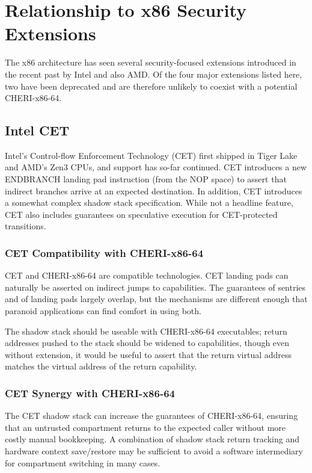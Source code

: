 \section{Relationship to x86 Security Extensions}

The x86 architecture has seen several security-focused extensions introduced
in the recent past by Intel and also AMD.
Of the four major extensions listed here, two have been deprecated
and are therefore unlikely to coexist with a potential CHERI-x86-64.

\subsection{Intel CET}
Intel's Control-flow Enforcement Technology (CET) first shipped in Tiger Lake
and AMD's Zen3 CPUs, and support has so-far continued.
CET introduces a new ENDBRANCH landing pad instruction (from the NOP space) to
assert that indirect branches arrive at an expected destination.
In addition, CET introduces a somewhat complex shadow stack specification.
While not a headline feature,
CET also includes guarantees on speculative execution for CET-protected
transitions.

\subsubsection{CET Compatibility with CHERI-x86-64}
CET and CHERI-x86-64 are compatible technologies.
CET landing pads can naturally be asserted on indirect jumps to capabilities.
The guarantees of sentries and of landing pads largely overlap, but the
mechanisms are different enough that paranoid applications can find comfort
in using both.

The shadow stack should be useable with CHERI-x86-64 executables;
return addresses pushed to the stack should be widened to capabilities,
though even without extension, it would be useful to assert that the return
virtual address matches the virtual address of the return capability.

\subsubsection{CET Synergy with CHERI-x86-64}

The CET shadow stack can increase the guarantees of CHERI-x86-64,
ensuring that an untrusted compartment returns to the expected
caller without more costly manual bookkeeping.
A combination of shadow stack return tracking and hardware context
save/restore may be sufficient to avoid a software intermediary
for compartment switching in many cases.

